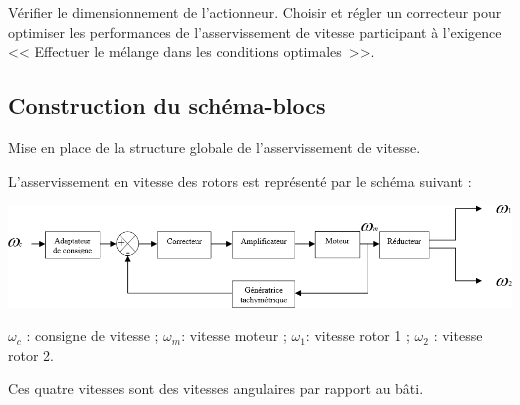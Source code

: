 \documentclass[10pt,fleqn]{article} %
\begin{document}
\begin{obj}
Vérifier le dimensionnement de l'actionneur. Choisir et régler un correcteur pour optimiser les performances de l'asservissement de vitesse participant à l'exigence << Effectuer le mélange dans les conditions optimales~>>.
\end{obj}



\subsection{Construction du schéma-blocs}
\begin{obj}
Mise en place de la structure globale de l’asservissement de vitesse.
\end{obj}

L'asservissement en vitesse des rotors est représenté par le schéma suivant :

\begin{center}
\includegraphics[width=\linewidth]{images/e3a_01}
\end{center}

$\omega_c$ : consigne de vitesse ;  $\omega_m$: vitesse moteur ; $\omega_1$: vitesse rotor 1 ; $\omega_2$ : vitesse rotor 2.

\begin{rem}
Ces quatre vitesses sont des vitesses angulaires par rapport au bâti.
\end{rem}
\end{document}
